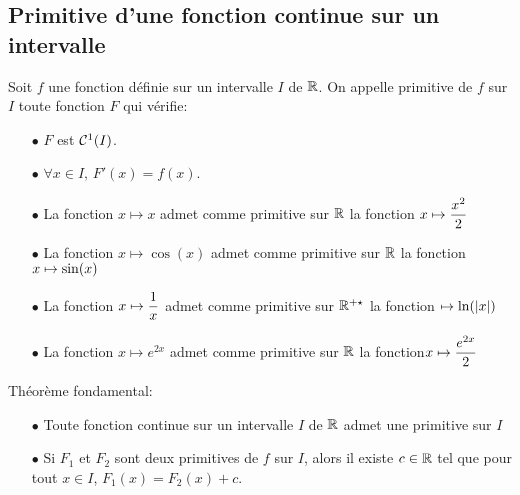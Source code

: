 \documentclass[a4paper, 11pt]{article}
\begin{document}
\subsection{Primitive d'une fonction continue sur un intervalle}




{

	\begin{defi}
		Soit $f$ une fonction d\'efinie sur un intervalle $I$ de $\mathbb{R}$. On appelle primitive de $f$ sur $I$ toute fonction $F$ qui v\'erifie:
		\begin{itemize}
			\item[$\bullet$] $F$ est $\mathcal{C}^1(I)$.
			\item[$\bullet$] $\forall x\in I, \, F'(x)=f(x)$.
		\end{itemize}
	\end{defi}

}

\begin{exemples}
	\begin{itemize}
		\item[$\bullet$] La fonction $x\mapsto x$ admet comme primitive sur $\mathbb{R}$ la fonction $\displaystyle x\mapsto \frac{x^2}{2}$
		\item[$\bullet$] La fonction $x\mapsto \cos{(x)}$ admet comme primitive sur $\mathbb{R}$ la fonction $\displaystyle x\mapsto \sin(x)$
		\item[$\bullet$] La fonction $x\mapsto \displaystyle\frac{1}{x}$ admet comme primitive sur $\mathbb{R}^{+\star}$ la fonction $\displaystyle \mapsto \ln(|x|)$
		\item[$\bullet$] La fonction $x\mapsto e^{2x}$ admet comme primitive sur $\mathbb{R}$ la fonction$\displaystyle x\mapsto \frac{e^{2x}}{2}$
	\end{itemize}
\end{exemples}






{

\begin{theorem} Th\'eor\`{e}me fondamental:
	\begin{itemize}
		\item[$\bullet$] Toute fonction continue sur un intervalle $I$ de $\mathbb{R}$ admet une primitive sur $I$
		\item[$\bullet$]
		      Si $F_1$ et $F_2$ sont deux primitives de $f$ sur $I$, alors il existe $c\in \mathbb{R}$ tel que pour tout $x\in I$,  $F_1(x) = F_2(x) +c$.
	\end{itemize}
\end{theorem}
}
\end{document}
